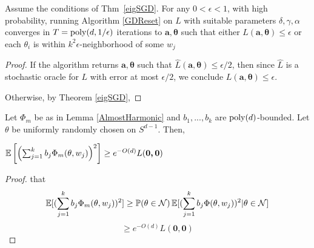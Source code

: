 \begin{corollary}
Assume the conditions of Thm~\ref{eigSGD}. For any $0 < \epsilon < 1$, with high probability, running Algorithm \ref{GDReset} on $L$ with suitable parameters $\delta, \gamma, \alpha$ converges in $T = \mathrm{poly}(d, 1/\epsilon)$ iterations to $\boldsymbol{a,\theta}$ such that either $L(\boldsymbol{a,\theta}) \leq \epsilon$ or each $\theta_i$ is within $k^2\epsilon$-neighborhood of some $w_j$
\end{corollary}

\begin{proof}
If the algorithm returns $\boldsymbol{a,\theta}$ such that $\widehat{L}(\boldsymbol{a,\theta}) \leq \epsilon/2$, then since $\widehat{L}$ is a stochastic oracle for $L$ with error at most $\epsilon/2$, we conclude $L(\boldsymbol{a,\theta}) \leq \epsilon$. 

Otherwise, by Theorem \ref{eigSGD}, 
\end{proof}





\begin{lemma}\label{bigVariance}
Let $\Phi_m$ be as in Lemma \ref{AlmostHarmonic} and $b_1,...,b_k$ are $\mathrm{poly}(d)$-bounded. Let $\theta$ be uniformly randomly chosen on $S^{d-1}$. Then,
 
 $\operatorname*{\mathbb{E}}\left[\left(  \sum_{j=1}^k b_j \Phi_m(\theta,w_j)\right)^2\right]
 \geq e^{-O(d)}L(\boldsymbol{0,0})$
\end{lemma}
\begin{proof}
 that 
\[\operatorname*{\mathbb{E}}[(  \sum_{j=1}^k b_j \Phi_m(\theta,w_j))^2]
 \geq \operatorname*{\mathbb{P}}(\theta \in \mathcal{N})\operatorname*{\mathbb{E}}[(\sum_{j=1}^k b_j \Phi(\theta, w_j))^2 | \theta \in \mathcal{N}]\]
\[\geq e^{-O(d)} L(\boldsymbol{0,0})\]
\end{proof}
\fi


